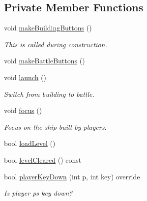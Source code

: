 \subsection*{Private Member Functions}
\begin{DoxyCompactItemize}
\item 
void \hyperlink{classMainWorld_a4c59edbfc967da60dd2eee28280434d1}{make\+Building\+Buttons} ()
\begin{DoxyCompactList}\small\item\em This is called during construction. \end{DoxyCompactList}\item 
void \hyperlink{classMainWorld_a34ff55bf7bec578a3eada27017973e77}{make\+Battle\+Buttons} ()
\item 
void \hyperlink{classMainWorld_ace8b3e2cbb1c1cb8d2a3fe149dabe734}{launch} ()
\begin{DoxyCompactList}\small\item\em Switch from building to battle. \end{DoxyCompactList}\item 
void \hyperlink{classMainWorld_a00895e34e30d1299e9d6d3aef874c2eb}{focus} ()
\begin{DoxyCompactList}\small\item\em Focus on the ship built by players. \end{DoxyCompactList}\item 
bool \hyperlink{classMainWorld_a4011961e71f2129896ce5248fe5ccf20}{load\+Level} ()
\item 
bool \hyperlink{classMainWorld_a27b5623f73157f016b93ea0e27cd3166}{level\+Cleared} () const 
\item 
bool \hyperlink{classMainWorld_a8e17a525de341eda83c8bcb1020e779b}{player\+Key\+Down} (int p, int key) override
\begin{DoxyCompactList}\small\item\em Is player p\textquotesingle{}s key down? \end{DoxyCompactList}\end{DoxyCompactItemize}
